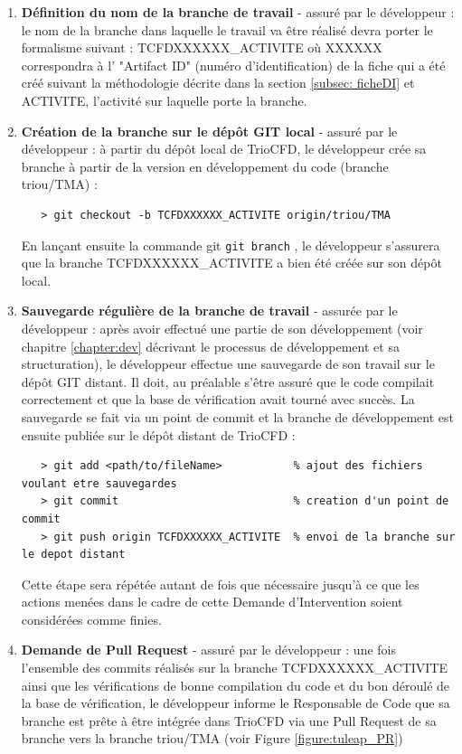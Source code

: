 \begin{enumerate}
   \item \textbf{Définition du nom de la branche de travail} - assuré par le développeur : le nom de la branche dans laquelle le travail va être réalisé devra porter le formalisme suivant : TCFDXXXXXX\_ACTIVITE où XXXXXX correspondra à l' "Artifact ID" (numéro d'identification) de la fiche qui a été créé suivant la méthodologie   décrite dans la section \ref{subsec: ficheDI} et ACTIVITE, l'activité sur laquelle porte la branche.
   \item \textbf{Création de la branche sur le dépôt GIT local} - assuré par le développeur : à partir du dépôt local de TrioCFD, le développeur crée sa branche à partir de la version en développement du code (branche triou/TMA) : 
   \begin{lstlisting}
   > git checkout -b TCFDXXXXXX_ACTIVITE origin/triou/TMA
   \end{lstlisting}
   En lançant ensuite la commande git \texttt{git branch} , le développeur s'assurera que la branche TCFDXXXXXX\_ACTIVITE a bien été créée sur son dépôt local.
   \item \textbf{Sauvegarde régulière de la branche de travail} - assurée par le développeur : après avoir effectué une partie de son développement (voir chapitre \ref{chapter:dev} décrivant le processus de développement et sa structuration), le développeur effectue une sauvegarde de son travail sur le dépôt GIT distant. Il doit, au préalable s'être assuré que le code compilait correctement et que la base de vérification avait tourné avec succès. La sauvegarde se fait via un point de commit et la branche de développement est ensuite publiée sur le dépôt distant de TrioCFD :
   \footnotesize
   \begin{lstlisting}
   > git add <path/to/fileName>           % ajout des fichiers voulant etre sauvegardes
   > git commit                           % creation d'un point de commit
   > git push origin TCFDXXXXXX_ACTIVITE  % envoi de la branche sur le depot distant
   \end{lstlisting}
   \normalsize
   Cette étape sera répétée autant de fois que nécessaire jusqu'à ce que les actions menées dans le cadre de cette Demande d'Intervention soient considérées comme finies. 
   \item \textbf{Demande de Pull Request} - assuré par le développeur : une fois l'ensemble des commits réalisés sur la branche TCFDXXXXXX\_ACTIVITE ainsi que les vérifications de bonne compilation du code et du bon déroulé de la base de vérification, le développeur informe le Responsable de Code que sa branche est prête à être intégrée dans TrioCFD via une Pull Request de sa branche vers la branche triou/TMA (voir Figure \ref{figure:tuleap_PR})

\end{enumerate}
